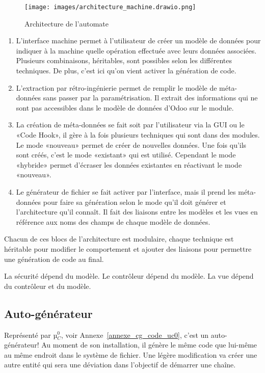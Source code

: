 \begin{figure}[htb]
\centering
\texttt{[image: images/architecture\_machine.drawio.png]}
\caption{Architecture de l'automate}
\label{fig:dia_architecture_automate}
\end{figure}

\begin{enumerate}
    \item L’interface machine permet à l’utilisateur de créer un modèle de données pour indiquer à la machine quelle opération effectuée avec leurs données associées. Plusieurs combinaisons, héritables, sont possibles selon les différentes techniques. De plus, c’est ici qu’on vient activer la génération de code.
    \item L’extraction par rétro-ingénierie permet de remplir le modèle de méta-données sans passer par la paramétrisation. Il extrait des informations qui ne sont pas accessibles dans le modèle de données d’Odoo sur le module.
    \item La création de méta-données se fait soit par l’utilisateur via la GUI ou le «Code Hook», il gère à la fois plusieurs techniques qui sont dans des modules. Le mode «nouveau» permet de créer de nouvelles données. Une fois qu’ils sont créés, c’est le mode «existant» qui est utilisé. Cependant le mode «hybride» permet d’écraser les données existantes en réactivant le mode «nouveau».
    \item Le générateur de fichier se fait activer par l’interface, mais il prend les méta-données pour faire sa génération selon le mode qu’il doit générer et l’architecture qu’il connaît. Il fait des liaisons entre les modèles et les vues en référence aux noms des champs de chaque modèle de données.
\end{enumerate}

Chacun de ces blocs de l’architecture est modulaire, chaque technique est héritable pour modifier le comportement et ajouter des liaisons pour permettre une génération de code au final.

La sécurité dépend du modèle. Le contrôleur dépend du modèle. La vue dépend du contrôleur et du modèle.

\subsection{Auto-générateur}

Représenté par µ$_C^0$, voir Annexe~\ref{annexe_cg_code_uc0}, c’est un auto-générateur! Au moment de son installation, il génère le même code que lui-même au même endroit dans le système de fichier. Une légère modification va créer une autre entité qui sera une déviation dans l’objectif de démarrer une chaîne.

